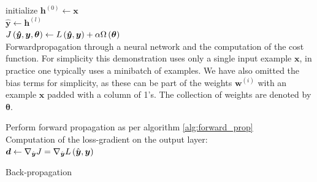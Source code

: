 \begin{algorithm}\label{alg:forward_prop}
\SetAlgoLined
{}
 initialize $\boldsymbol{h}^{(0)} \leftarrow \boldsymbol{x}$ \\
$\hat{\boldsymbol{y}} \leftarrow \boldsymbol{h}^{(l)}$ \\
$J\left (\boldsymbol{\hat{y}}, \boldsymbol{y}, \boldsymbol{\theta}\right) \leftarrow L\left (\boldsymbol{\hat{y}}, \boldsymbol{y}\right) + \alpha \Omega \left (\boldsymbol{\theta}\right)$ \\
 \caption{Forwardpropagation through a neural network and the computation of the cost function. For simplicity this demonstration uses only a single input example $\boldsymbol{x}$, in practice one typically uses a minibatch of examples. We have also omitted the bias terms for simplicity, as these can be part of the weights $\boldsymbol{w}^{(i)}$ with an example $\boldsymbol{x}$ padded with a column of 1's. The collection of weights are denoted by $\boldsymbol{\theta}$.}
\end{algorithm}

\begin{algorithm}\label{alg:back_prop}
\SetAlgoLined
{}
Perform forward propagation as per algorithm \ref{alg:forward_prop}\\
Computation of the loss-gradient on the output layer:\\
$\boldsymbol{d} \leftarrow \nabla_{\hat{\boldsymbol{y}}} J =  \nabla_{\hat{\boldsymbol{y}}} L\left (\hat{\boldsymbol{y}}, \boldsymbol{y}\right)$ \\
\caption{Back-propagation}
\end{algorithm}

